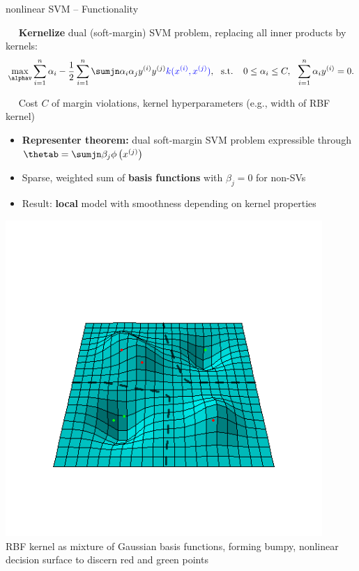 \begin{frame}{nonlinear SVM -- Functionality}

\footnotesize

 ~~ \textbf{Kernelize} dual (soft-margin) SVM problem, 
replacing all inner products by kernels:
$$\max_{\alphav} \sumin \alpha_i - \frac{1}{2}\sumin \sumjn
\alpha_i\alpha_j\yi y^{(j)} \textcolor{blue}{k(\xi, \xi[j])}, ~~ \text{s.t. } ~~ 
0 \le \alpha_i \le C, ~~ \sumin \alpha_i \yi = 0.
$$

\medskip

 ~~ Cost $C$ of margin violations, kernel 
hyperparameters (e.g., width of RBF kernel)

\medskip


\begin{minipage}[c]{0.5\textwidth}

  \begin{itemize}
    \item \textbf{Representer theorem:} dual soft-margin SVM problem expressible 
    through $\thetab = \sumjn \beta_j \phi \left(\xi[j] \right)$ \\
    \item Sparse, weighted sum of \textbf{basis functions} with $\beta_j = 0$ 
    for non-SVs
    \item Result: \textbf{local} model with smoothness depending on kernel 
    properties
  \end{itemize}
\end{minipage}
\hfill
\begin{minipage}[c]{0.4\textwidth}
  \centering
  \includegraphics[width=0.9\textwidth, trim=0 70 0 100, clip]{
  ../slides/nonlinear-svm/figure/svm_rbf_as_basis.png} \\
  \tiny{RBF kernel as mixture of Gaussian basis functions, forming
  bumpy, nonlinear decision surface to discern red and green points}
\end{minipage}

\end{frame}

